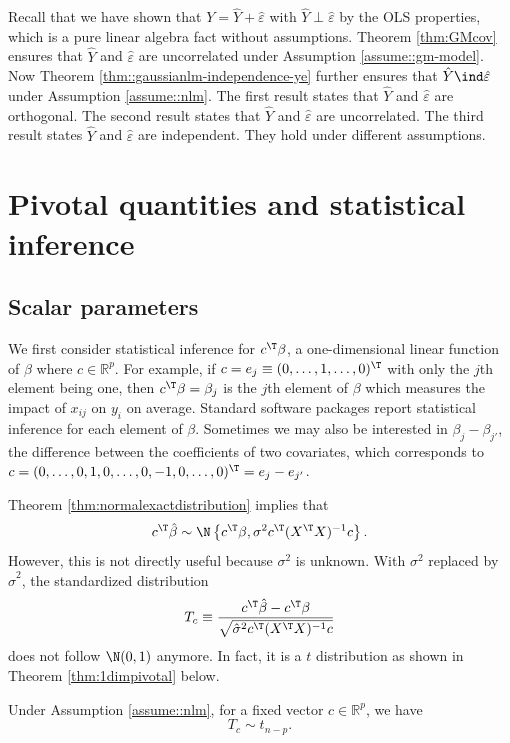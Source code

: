 Recall that we have shown that $Y = \hat{Y}  + \hat{\varepsilon}$ with $\hat{Y}  \perp  \hat{\varepsilon}$ by the OLS properties, which is a pure linear algebra fact without assumptions.
Theorem \ref{thm:GMcov} ensures that $\hat{Y} $ and $  \hat{\varepsilon}$ are uncorrelated under Assumption \ref{assume::gm-model}.
Now Theorem \ref{thm::gaussianlm-independence-ye} further ensures that $\hat{Y}  \ind  \hat{\varepsilon}$ under Assumption \ref{assume::nlm}. The first result states that $\hat{Y} $ and $  \hat{\varepsilon}$
are orthogonal. The second result states that $\hat{Y} $ and $  \hat{\varepsilon}$ are uncorrelated. The third result states $\hat{Y} $ and $  \hat{\varepsilon}$ are independent. They hold under different assumptions. 



\section{Pivotal quantities and statistical inference}

\subsection{Scalar parameters}
We first consider statistical inference for $c ^{\T}\beta$,
a one-dimensional linear function of $\beta$ where $c \in\mathbb{R}^{p}.$
For example, if $c = e_j \equiv   (0,\ldots,1,\ldots,0)^{\T}$ with only the
$j$th element being one, then $c ^{\T}\beta=\beta_{j}$ is the
$j$th element of $\beta$ which measures the impact of $x_{ij}$
on $y_{i}$ on average. Standard software packages report statistical
inference for each element of $\beta$. Sometimes we may also be interested in $\beta_j - \beta_{j'}$, the difference between the coefficients of two covariates, which corresponds to $c=(0, \ldots,0,1,0,\ldots,0,-1,0,\ldots,0)^{\T} = e_j - e_{j'}$. 

Theorem \ref{thm:normalexactdistribution} implies that 
\[
c ^{\T}\hat{\beta}\sim\N\left\{ c ^{\T}\beta,\sigma^{2}c ^{\T}(X^{\T}X)^{-1}c \right\} .
\]
However, this is not directly useful because $\sigma^{2}$ is unknown.
With $\sigma^{2}$ replaced by $\hat{\sigma}^{2}$, the standardized
distribution
\[
T_c \equiv 
\frac{c ^{\T}\hat{\beta}-c ^{\T}\beta}{\sqrt{\hat{\sigma}^{2}c ^{\T}(X^{\T}X)^{-1}c }}
\]
does not follow $\N(0,1)$ anymore. In fact, it is a $t$ distribution as shown in Theorem \ref{thm:1dimpivotal} below. 

\begin{theorem}
\label{thm:1dimpivotal}Under Assumption \ref{assume::nlm}, for a fixed vector $c  \in \mathbb{R}^p$, we have 
$$
T_c  \sim t_{n-p}.
$$
\end{theorem}


